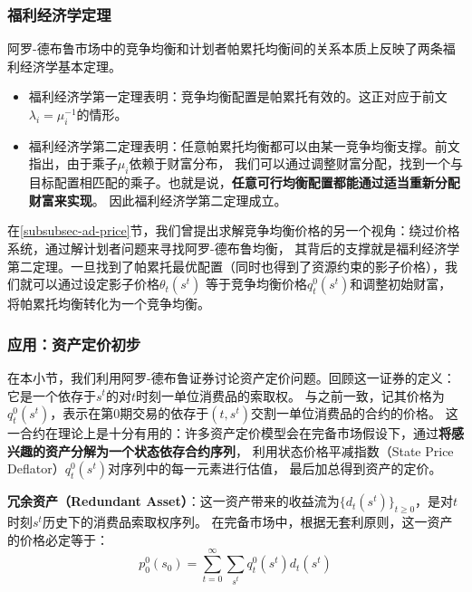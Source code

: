 \subsubsection{福利经济学定理}

阿罗-德布鲁市场中的竞争均衡和计划者帕累托均衡间的关系本质上反映了两条福利经济学基本定理。
\begin{itemize}
    \item 福利经济学第一定理表明：竞争均衡配置是帕累托有效的。这正对应于前文$\lambda_i=\mu_i^{-1}$的情形。
    \item 福利经济学第二定理表明：任意帕累托均衡都可以由某一竞争均衡支撑。前文指出，由于乘子$\mu_i$依赖于财富分布，
        我们可以通过调整财富分配，找到一个与目标配置相匹配的乘子。也就是说，\textbf{任意可行均衡配置都能通过适当重新分配财富来实现}。
        因此福利经济学第二定理成立。
\end{itemize}

在\ref{subsubsec-ad-price}节，我们曾提出求解竞争均衡价格的另一个视角：绕过价格系统，通过解计划者问题来寻找阿罗-德布鲁均衡，
其背后的支撑就是福利经济学第二定理。一旦找到了帕累托最优配置（同时也得到了资源约束的影子价格），我们就可以通过设定影子价格$\theta_t\left(s^t\right)$
等于竞争均衡价格$q_t^0\left(s^t\right)$和调整初始财富，将帕累托均衡转化为一个竞争均衡。


\subsubsection{应用：资产定价初步}

在本小节，我们利用阿罗-德布鲁证券讨论资产定价问题。回顾这一证券的定义：它是一个依存于$s^t$的对$t$时刻一单位消费品的索取权。
与之前一致，记其价格为$q_t^0\left(s^t\right)$，表示在第$0$期交易的依存于$(t,s^t)$交割一单位消费品的合约的价格。
这一合约在理论上是十分有用的：许多资产定价模型会在完备市场假设下，通过\textbf{将感兴趣的资产分解为一个状态依存合约序列}，
利用状态价格平减指数（State Price Deflator）$q_t^0\left(s^t\right)$对序列中的每一元素进行估值，
最后加总得到资产的定价。

\begin{example}
    \textbf{冗余资产（Redundant Asset）}：这一资产带来的收益流为$\{d_t\left(s^t\right)\}_{t\geq 0}$，是对$t$时刻$s^t$历史下的消费品索取权序列。
    在完备市场中，根据无套利原则，这一资产的价格必定等于：
    \begin{equation}    \label{eq-price-redundant}
        p_0^0\left(s_0\right)=\sum_{t=0}^{\infty} \sum_{s^t} q_t^0\left(s^t\right) d_t\left(s^t\right)
    \end{equation}
\end{example}

